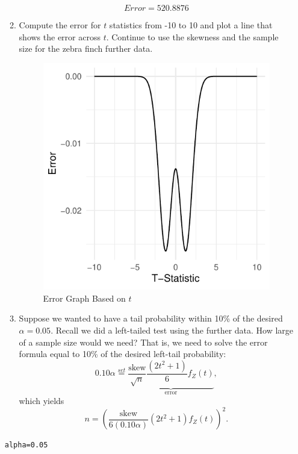 \documentclass{article}\usepackage[]{graphicx}\usepackage[]{xcolor}
\makeatletter
\def\maxwidth{ %
  \ifdim\Gin@nat@width>\linewidth
    \linewidth
  \else
    \Gin@nat@width
  \fi
}
\newcommand{\hlnum}[1]{\textcolor[rgb]{0.686,0.059,0.569}{#1}}%
\newcommand{\hldef}[1]{\textcolor[rgb]{0.345,0.345,0.345}{#1}}%
\newcommand{\hlkwb}[1]{\textcolor[rgb]{0.69,0.353,0.396}{#1}}%
\newenvironment{kframe}{%
 \def\at@end@of@kframe{}%
 \ifinner\ifhmode%
  \def\at@end@of@kframe{\end{minipage}}%
  \begin{minipage}{\columnwidth}%
 \fi\fi%
 \def\FrameCommand##1{\hskip\@totalleftmargin \hskip-\fboxsep
 \colorbox{shadecolor}{##1}\hskip-\fboxsep
     \hskip-\linewidth \hskip-\@totalleftmargin \hskip\columnwidth}%
 \MakeFramed {\advance\hsize-\width
   \@totalleftmargin\z@ \linewidth\hsize
   \@setminipage}}%
 {\par\unskip\endMakeFramed%
 \at@end@of@kframe}
\newenvironment{knitrout}{}{} %
\makeatother
\begin{document}
\begin{enumerate}
\begin{enumerate}
\[ Error = 520.8876\]


  \item Compute the error for $t$ statistics from -10 to 10 and plot a line
  that shows the error across $t$. Continue to use the skewness and 
  the sample size for the zebra finch further data.
\begin{figure}[ht]
\begin{center}
\begin{knitrout}
\color{fgcolor}
\includegraphics[width=\maxwidth]{figure/errorgraph-1} 
\end{knitrout}
\caption{Error Graph Based on $t$}
\label{fig:errorgraph}
\end{center}
\end{figure}



  \item Suppose we wanted to have a tail probability within 10\% of the desired
  $\alpha=0.05$. Recall we did a left-tailed test using the further data.
  How large of a sample size would we need? That is, we need
  to solve the error formula equal to 10\% of the desired left-tail probability:
  \[0.10 \alpha  \stackrel{set}{=} \underbrace{\frac{\text{skew}}{\sqrt{n}} \frac{(2t^2+1)}{6} f_Z(t)}_{\textrm{error}},\]
  which yields
  \[ n = \left(\frac{\text{skew}}{6(0.10\alpha)} (2t^2 + 1) f_Z(t)\right)^2.\]
\end{enumerate}
\begin{knitrout}\scriptsize
{}\color{fgcolor}\begin{kframe}
\begin{alltt}
\hldef{alpha} \hlkwb{=} \hlnum{0.05}


\end{alltt}
\end{kframe}
\end{knitrout}
\end{enumerate}
\end{document}
